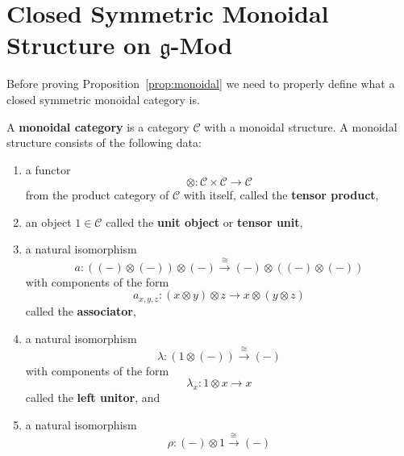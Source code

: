 \section{Closed Symmetric Monoidal Structure on $ \mathfrak{g} $-Mod} %
\label{sec:Closed Symmetric Monoidal Structure on}
Before proving Proposition~\ref{prop:monoidal} we need to properly define what a closed symmetric monoidal category is.

\begin{definition}
  A \textbf{monoidal category} is a category $ \mathcal{C} $ with a monoidal structure. A monoidal structure consists of the following data:
  \begin{enumerate}[label=(\roman*)]
    \item a functor
      \begin{equation}
        \otimes: \mathcal{C} \times \mathcal{C} \to \mathcal{C}
        \label{eq:tensor}
      \end{equation}
      from the product category of $ \mathcal{C} $ with itself, called the \textbf{tensor product},
    \item an object $ 1 \in \mathcal{C} $ called the \textbf{unit object} or \textbf{tensor unit},
    \item a natural isomorphism
      \begin{equation}
        a: ((-) \otimes (-)) \otimes (-) \xrightarrow{\cong} (-) \otimes ((-) \otimes (-))
        \label{eq:associator}
      \end{equation}
      with components of the form
      \begin{equation}
        a_{x,y,z}: (x \otimes y) \otimes z \to x \otimes (y \otimes z)
        \label{eq:compformasso}
      \end{equation}
      called the \textbf{associator},
    \item a natural isomorphism
      \begin{equation}
        \lambda: (1 \otimes (-)) \xrightarrow{\cong} (-)
        \label{eq:leftunit}
      \end{equation}
      with components of the form
      \begin{equation}
        \lambda_x: 1 \otimes x \to x
      \end{equation}
      called the \textbf{left unitor}, and
    \item a natural isomorphism
      \begin{equation}
        \rho: (-) \otimes 1 \xrightarrow{\cong} (-)
        \label{eq:rightunit}

\end{equation}
\end{enumerate}
\end{definition}

